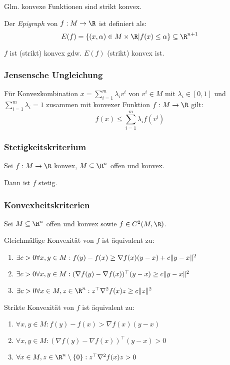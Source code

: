 Glm. konvexe Funktionen sind strikt konvex.

\spacing

Der \emph{Epigraph} von \(f : M \to \R\) ist definiert als: \[E(f) = \{(x,\alpha) \in M \times \R | f(x) \leq \alpha\} \subseteq \R^{n+1}\]

\(f\) ist (strikt) konvex gdw. \(E(f)\) (strikt) konvex ist.

\subsubsection*{Jensensche Ungleichung}

Für Konvexkombination \(x = \sum_{i=1}^m \lambda_i v^i\) von \(v^i \in M\) mit \(\lambda_i \in [0,1]\) und \(\sum_{i=1}^m \lambda_i = 1\) zusammen mit konvexer Funktion \(f: M \to \R\) gilt: \[f(x) \leq \sum_{i=1}^m \lambda_i f(v^i)\]

\subsubsection*{Stetigkeitskriterium}

Sei \(f : M \to \R\) konvex, \(M \subseteq \R^n\) offen und konvex.

Dann ist \(f\) stetig.

\subsubsection*{Konvexheitskriterien}

Sei \(M \subseteq \R^n\) offen und konvex sowie \(f \in C^2(M,\R)\).

Gleichmäßige Konvexität von \(f\) ist äquivalent zu:

\begin{enumerate}[label=(\alph*)]
\item \(\exists c > 0 \forall x, y \in M : \\ f(y)-f(x) \geq \nabla f(x)(y-x) + c\|y-x\|^2\)
\item \(\exists c > 0 \forall x, y \in M : \\ (\nabla f(y) - \nabla f(x))^\top (y-x) \geq c\|y-x\|^2\)
\item \(\exists c > 0 \forall x \in M, z \in \R^n : z^\top \nabla^2 f(x)z \geq c\|z\|^2\)
\end{enumerate}

Strikte Konvexität von \(f\) ist äquivalent zu:

\begin{enumerate}[label=(\alph*)]
\item \(\forall x, y \in M : f(y)-f(x) > \nabla f(x)(y-x)\)
\item \(\forall x, y \in M : (\nabla f(y) - \nabla f(x))^\top (y-x) > 0\)
\item \(\forall x \in M, z \in \R^n \setminus \{0\} : z^\top \nabla^2 f(x)z > 0\)
\end{enumerate}

